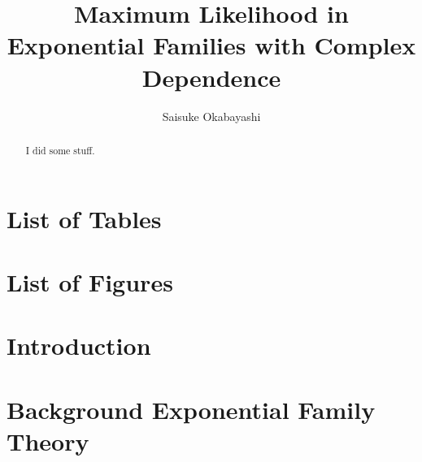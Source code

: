 \documentclass[oneside]{myumnStatThesis}
\author{Saisuke Okabayashi}
\title{Maximum Likelihood in Exponential Families with Complex Dependence}
\begin{document}
\maketitlepage %
\makecopyrightpage %

\frontmatter


\begin{abstract}

I did some stuff.


\end{abstract}

\tableofcontents %

\newpage
\chapter*{List of Tables}
{\def\chapter*#1{}
\listoftables}

\newpage
\chapter*{List of Figures}
{\def\chapter*#1{}
\listoffigures}


\mainmatter

\chapter{Introduction}
%

\chapter{Background Exponential Family Theory}\label{S:}
%

%
%
%
%
%
\end{document}
